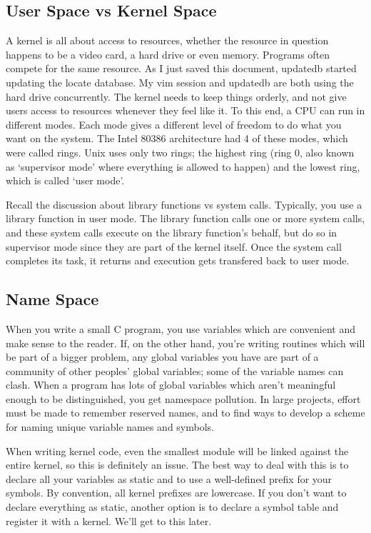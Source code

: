 \documentclass[10pt, oneside]{book}
\begin{document}
\subsection{User Space vs Kernel Space}
\label{sec:org547d7b8}
A kernel is all about access to resources, whether the resource in question happens to be a video card, a hard drive or even memory. Programs often compete for the same resource. As I just saved this document, updatedb started updating the locate database. My vim session and updatedb are both using the hard drive concurrently. The kernel needs to keep things orderly, and not give users access to resources whenever they feel like it. To this end, a CPU can run in different modes. Each mode gives a different level of freedom to do what you want on the system. The Intel 80386 architecture had 4 of these modes, which were called rings. Unix uses only two rings; the highest ring (ring 0, also known as `supervisor mode' where everything is allowed to happen) and the lowest ring, which is called `user mode'.

Recall the discussion about library functions vs system calls. Typically, you use a library function in user mode. The library function calls one or more system calls, and these system calls execute on the library function's behalf, but do so in supervisor mode since they are part of the kernel itself. Once the system call completes its task, it returns and execution gets transfered back to user mode.

\subsection{Name Space}
\label{sec:org81b5bd4}
When you write a small C program, you use variables which are convenient and make sense to the reader. If, on the other hand, you're writing routines which will be part of a bigger problem, any global variables you have are part of a community of other peoples' global variables; some of the variable names can clash. When a program has lots of global variables which aren't meaningful enough to be distinguished, you get namespace pollution. In large projects, effort must be made to remember reserved names, and to find ways to develop a scheme for naming unique variable names and symbols.

When writing kernel code, even the smallest module will be linked against the entire kernel, so this is definitely an issue. The best way to deal with this is to declare all your variables as static and to use a well-defined prefix for your symbols. By convention, all kernel prefixes are lowercase. If you don't want to declare everything as static, another option is to declare a symbol table and register it with a kernel. We'll get to this later.
\end{document}
